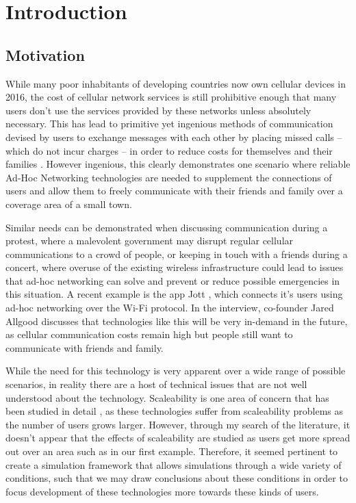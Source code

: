 \section{Introduction}
\subsection{Motivation}
While many poor inhabitants of developing countries now own cellular devices in 2016, the cost
of cellular network services is still prohibitive enough that many users don't use the services
provided by these networks unless absolutely necessary.
This has lead to primitive yet ingenious methods of communication devised by users to exchange 
messages with each other by placing missed calls -- which do not incur charges -- in order to 
reduce costs for themselves and their families \cite{beeping}.
However ingenious, this clearly demonstrates one scenario where reliable Ad-Hoc Networking
technologies are needed to supplement the connections of users and allow them to freely 
communicate with their friends and family over a coverage area of a small town.

Similar needs can be demonstrated when discussing communication during a protest,
where a malevolent government may disrupt regular cellular communications to a crowd of people,
or keeping in touch with a friends during a concert, where overuse of the existing 
wireless infrastructure could lead to issues that ad-hoc networking can solve and prevent or 
reduce possible emergencies in this situation.
A recent example is the app Jott \cite{jott-techcrunch,jott-forbes}, which connects it's users
using ad-hoc networking over the Wi-Fi protocol. In the interview, co-founder Jared Allgood
discusses that technologies like this will be very in-demand in the future, as cellular 
communication costs remain high but people still want to communicate with friends and family.

While the need for this technology is very apparent over a wide range of possible scenarios,
in reality there are a host of technical issues that are not well understood about the technology.
Scaleability is one area of concern that has been studied in detail \cite{lee01}, as these
technologies suffer from scaleability problems as the number of users grows larger.
However, through my search of the literature, it doesn't appear that the effects of scaleability
are studied as users get more spread out over an area such as in our first example.
Therefore, it seemed pertinent to create a simulation framework that allows simulations through
a wide variety of conditions, such that we may draw conclusions about these conditions in order
to focus development of these technologies more towards these kinds of users.

